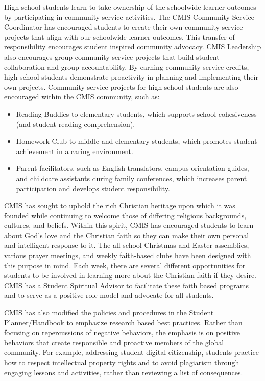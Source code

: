 High school students learn to take ownership of the schoolwide learner outcomes by participating in community service activities. The CMIS Community Service Coordinator has encouraged students to create their own community service projects that align with our schoolwide learner outcomes. This transfer of responsibility encourages student inspired community advocacy.  CMIS Leadership also encourages group community service projects that build student collaboration and group accountability. By earning community service credits, high school students demonstrate proactivity in planning and implementing their own projects.  Community service projects for high school students are also encouraged within the CMIS community, such as: 
\begin{itemize}
\item Reading Buddies to elementary students, which supports school cohesiveness (and student reading comprehension). 
\item Homework Club to middle and elementary students, which promotes student achievement in a caring environment. 
\item Parent facilitators, such as English translators, campus orientation guides, and childcare assistants during family conferences, which increases parent participation and develops student responsibility.
\end{itemize}
 

CMIS has sought to uphold the rich Christian heritage upon which it was founded while continuing to welcome those of differing religious backgrounds, cultures, and beliefs. Within this spirit, CMIS has encouraged students to learn about God’s love and the Christian faith so they can make their own personal and intelligent response to it. The all school Christmas and Easter assemblies, various prayer meetings, and weekly faith-based clubs have been designed with this purpose in mind. Each week, there are several different opportunities for students to be involved in learning more about the Christian faith if they desire. CMIS has a Student Spiritual Advisor to facilitate these faith based programs and to serve as a positive role model and advocate for all students.

CMIS has also modified the policies and procedures in the Student Planner/Handbook to emphasize research based best practices. Rather than focusing on repercussions of negative behaviors, the emphasis is on positive behaviors that create responsible and proactive members of the global community.  For example, addressing student digital citizenship, students practice how to respect intellectual property rights and to avoid plagiarism through engaging lessons and activities, rather than reviewing a list of consequences. 


